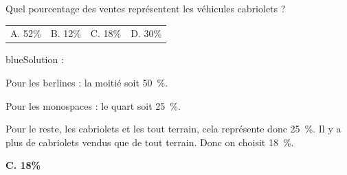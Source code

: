 \documentclass[10pt]{article}
\begin{document}
Quel pourcentage des ventes représentent les véhicules cabriolets ?
\begin{center}
\begin{tabularx}{.92\linewidth}{XXXX} A. 52\% & B. 12\% & C. 18\% & D. 30\%\end{tabularx}
\end{center}

\begin{color}{blue}Solution :\par
Pour les berlines : la moitié soit 50~\%.

Pour les monospaces : le quart soit 25~\%.

Pour le reste, les cabriolets et les tout terrain, cela représente donc 25~\%. Il y a plus de cabriolets vendus que de tout terrain. Donc on choisit 18~\%.

\textbf{C. 18\%}
\end{color}
\end{document}
